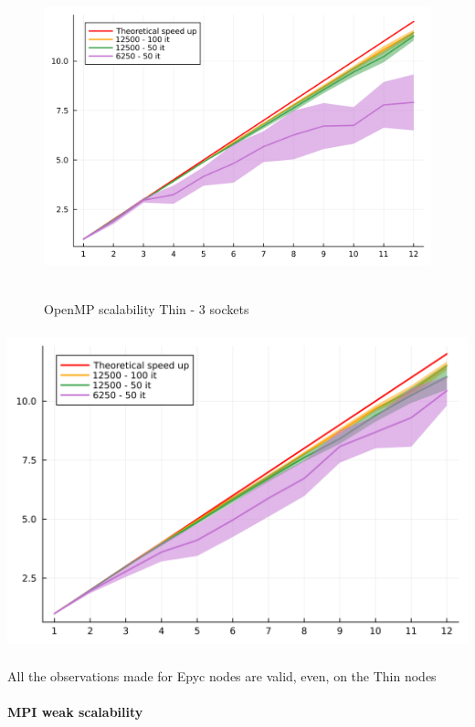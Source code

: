 \documentclass[
  letterpaper,
  DIV=11,
  numbers=noendperiod]{scrartcl}
\let\oldparagraph\paragraph
\renewcommand{\paragraph}[1]{\oldparagraph{#1}\mbox{}}
\begin{document}
\begin{figure}

{\centering \includegraphics[width=\textwidth,height=3.64583in]{img/thin_3_sockets.png}

}

\caption{OpenMP scalability Thin - 3 sockets}

\end{figure}

\includegraphics[width=\textwidth,height=3.64583in]{img/thin_4_sockets.png}
\newpage

All the observations made for Epyc nodes are valid, even, on the Thin
nodes

\hypertarget{mpi-weak-scalability}{%
\paragraph{MPI weak scalability}\label{mpi-weak-scalability}}
\end{document}
